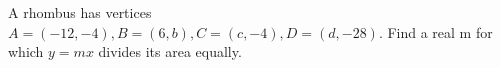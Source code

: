 A rhombus has vertices $A=(-12,-4),B=(6,b),C=(c,-4),D=(d,-28)$. Find a real m for which $y=mx$ divides its area equally.
